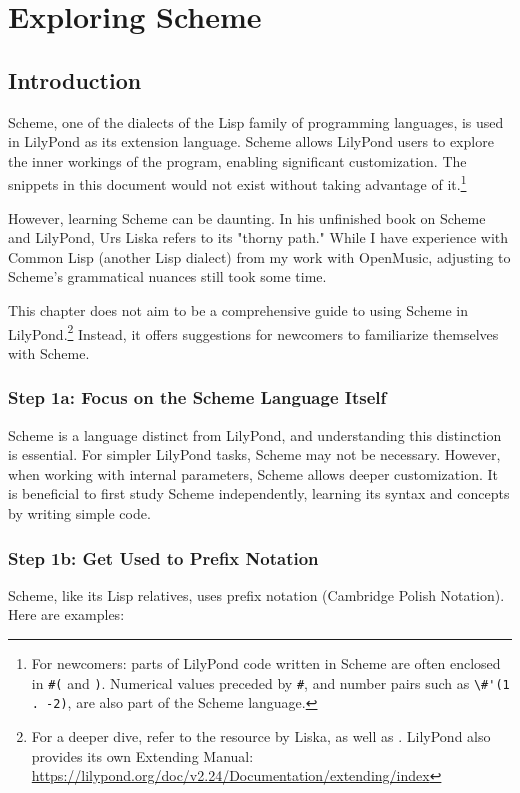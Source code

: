 
\chapter {Exploring Scheme}
\VerbatimFootnotes
\section {Introduction}
Scheme, one of the dialects of the Lisp family of programming languages, is used in LilyPond as its extension language. Scheme allows LilyPond users to explore the inner workings of the program, enabling significant customization. The snippets in this document would not exist without taking advantage of it.\footnote{For newcomers: parts of LilyPond code written in Scheme are often enclosed in \verb+#(+ and \verb+)+. Numerical values preceded by \verb+#+, and number pairs such as \verb+\#'(1 . -2)+, are also part of the Scheme language.} 

However, learning Scheme can be daunting. In his unfinished book on Scheme and LilyPond, Urs Liska refers to its "thorny path."\autocite{RN1739} While I have experience with Common Lisp (another Lisp dialect) from my work with OpenMusic, adjusting to Scheme’s grammatical nuances still took some time.

This chapter does not aim to be a comprehensive guide to using Scheme in LilyPond.\footnote{For a deeper dive, refer to the resource by Liska, as well as \cite{RN1740}. LilyPond also provides its own Extending Manual: \url{https://lilypond.org/doc/v2.24/Documentation/extending/index}} Instead, it offers suggestions for newcomers to familiarize themselves with Scheme.

\subsection{Step 1a: Focus on the Scheme Language Itself}
Scheme is a language distinct from LilyPond, and understanding this distinction is essential. For simpler LilyPond tasks, Scheme may not be necessary. However, when working with internal parameters, Scheme allows deeper customization. It is beneficial to first study Scheme independently, learning its syntax and concepts by writing simple code.

\subsection{Step 1b: Get Used to Prefix Notation}
Scheme, like its Lisp relatives, uses prefix notation (Cambridge Polish Notation). Here are examples:

